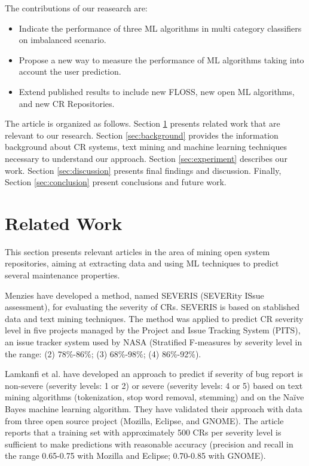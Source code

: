 \documentclass[10pt, conference]{IEEEtran}
\begin{document}
The contributions of our reasearch are:


\begin{itemize}
  \item Indicate the performance of three ML algorithms in multi category classifiers on imbalanced scenario. 
  \item Propose a new way to measure the performance of ML algorithms taking into account the user prediction.
  \item Extend published results to include new FLOSS, new open ML algorithms, and new CR Repositories.
\end{itemize}


The article is organized as follows. Section \ref{sec:relatedwork} presents related work that are relevant to our research. Section \ref{sec:background} provides the information background about CR systems, text mining and machine learning techniques necessary to understand our approach. Section \ref{sec:experiment} describes our work. Section \ref{sec:discussion} presents final findings and discussion. Finally, Section \ref{sec:conclusion} present  conclusions and  future work.


\section{Related Work}\label{sec:relatedwork} 

This section presents relevant articles in the area of mining open system repositories, aiming at extracting data and using ML techniques to predict several maintenance properties. 

Menzies\cite{Menzies2008} have developed a method, named SEVERIS (SEVERity ISsue assessment), for evaluating the severity of CRs. SEVERIS is based on stablished data and text mining techniques. The method was applied to predict CR severity level in five projects managed by the Project and Issue Tracking System (PITS), an issue tracker system used by NASA (Stratified F-measures by severity level in the range: (2) 78\%-86\%; (3) 68\%-98\%; (4) 86\%-92\%).


Lamkanfi et al.\cite{Lamkanfi2010} have developed an approach to predict if severity of bug report is non-severe (severity levels: 1 or 2) or severe (severity levels: 4 or 5) based on text mining algorithms (tokenization, stop word removal, stemming) and on the Naïve Bayes machine learning algorithm. They have validated their approach with data from three open source project (Mozilla, Eclipse, and GNOME). The article reports that a training set with approximately 500 CRs per severity level is sufficient to make predictions with reasonable accuracy (precision and recall in the range 0.65-0.75 with Mozilla and Eclipse; 0.70-0.85 with GNOME).
\end{document}
